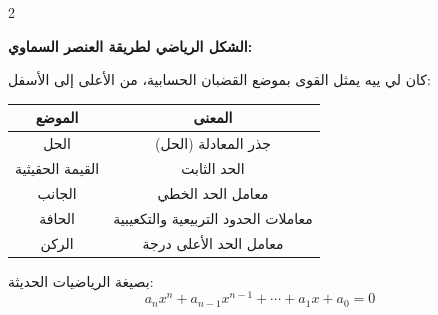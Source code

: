 \documentclass[11pt,a4paper]{article}
\newcommand{\ar}[1]{\arabicfont\beginR #1\endR}
\newcommand{\arnote}[1]{\textcolor{arabicblue}{\ar{#1}}}
\begin{document}
\begin{paracol}{2}
\begin{rightcolumn}
\arnote{\textbf{الشكل الرياضي لطريقة العنصر السماوي:}}

\arnote{كان لي ييه يمثل القوى بموضع القضبان الحسابية، من الأعلى إلى الأسفل:}
\begin{center}
\begin{tabular}{c|c}
\arnote{\textbf{الموضع}} & \arnote{\textbf{المعنى}} \\
\hline
\arnote{الحل} & \arnote{جذر المعادلة (الحل)} \\
\arnote{القيمة الحقيثية} & \arnote{الحد الثابت} \\
\arnote{الجانب} & \arnote{معامل الحد الخطي} \\
\arnote{الحافة} & \arnote{معاملات الحدود التربيعية والتكعيبية} \\
\arnote{الركن} & \arnote{معامل الحد الأعلى درجة} \\
\hline
\end{tabular}
\end{center}

\arnote{بصيغة الرياضيات الحديثة:}
$$a_n x^n + a_{n-1} x^{n-1} + \cdots + a_1 x + a_0 = 0$$
\end{rightcolumn}

\end{paracol}

\vspace{0.5cm}
\end{document}
